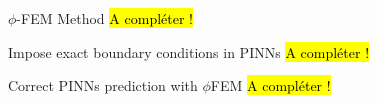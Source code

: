 \begin{frame}{$\phi$-FEM Method}
	\hl{A compléter !}
\end{frame}

\begin{frame}{Impose exact boundary conditions in PINNs}
	\hl{A compléter !}
\end{frame}

\begin{frame}{Correct PINNs prediction with $\phi$FEM}
	\hl{A compléter !}
\end{frame}